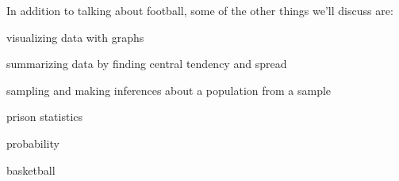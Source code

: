 \documentclass[fleqn, onecolumn]{article}
\begin{document}
  In addition to talking about football, some of the other things we'll discuss are:

  \begin{itemize*}
    \item visualizing data with graphs
    \item summarizing data by finding central tendency and spread
    \item sampling and making inferences about a population from a sample
    \item prison statistics
    \item probability
    \item basketball
  \end{itemize*}
  
\end{document}
